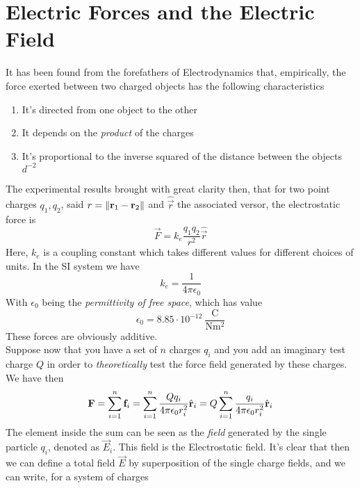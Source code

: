 \documentclass[../electromagnetism]{subfiles}
\begin{document}
\section{Electric Forces and the Electric Field}
It has been found from the forefathers of Electrodynamics that, empirically, the force exerted between two charged objects has the following characteristics
\begin{enumerate}
\item It's directed from one object to the other
\item It depends on the \textit{product} of the charges
\item It's proportional to the inverse squared of the distance between the objects $d^{-2}$
\end{enumerate}
The experimental results brought with great clarity then, that for two point charges $q_1,q_2$, said $r=\norm{\mathbf{r}_1-\mathbf{r}_2}$ and $\hat{\vec{r}}$ the associated versor, the electrostatic force is
\begin{equation}
	\vec{F}=k_e\frac{q_1q_2}{r^2}\hat{\vec{r}}
	\label{eq:electrostaticforce}
\end{equation}
Here, $k_e$ is a coupling constant which takes different values for different choices of units. In the SI system we have
\begin{equation}
	k_e=\frac{1}{4\pi\epsilon_0}
	\label{eq:escoupling}
\end{equation}
With $\epsilon_0$ being the \textit{permittivity of free space}, which has value
\begin{equation}
	\epsilon_0=8.85\cdot10^{-12}\ \mathrm{\frac{C}{Nm^2}}
	\label{eq:epsilonnot}
\end{equation}
These forces are obviously additive.\\
Suppose now that you have a set of $n$ charges $q_i$ and you add an imaginary test charge $Q$ in order to \textit{theoretically} test the force field generated by these charges. We have then
\begin{equation}
	\mathbf{F}=\sum_{i=1}^n\mathbf{f}_i=\sum_{i=1}^n\frac{Qq_i}{4\pi\epsilon_0 r_i^2}\hat{\mathbf{r}}_i=Q\sum_{i=1}^n\frac{q_i}{4\pi\epsilon_0r_i^2}\hat{\mathbf{r}}_i
	\label{eq:forceonimcharge}
\end{equation}
The element inside the sum can be seen as the \textit{field} generated by the single particle $q_i$, denoted as $\vec{E}_i$. This field is the Electrostatic field. It's clear that then we can define a total field $\vec{E}$ by superposition of the single charge fields, and we can write, for a system of charges
\end{document}
